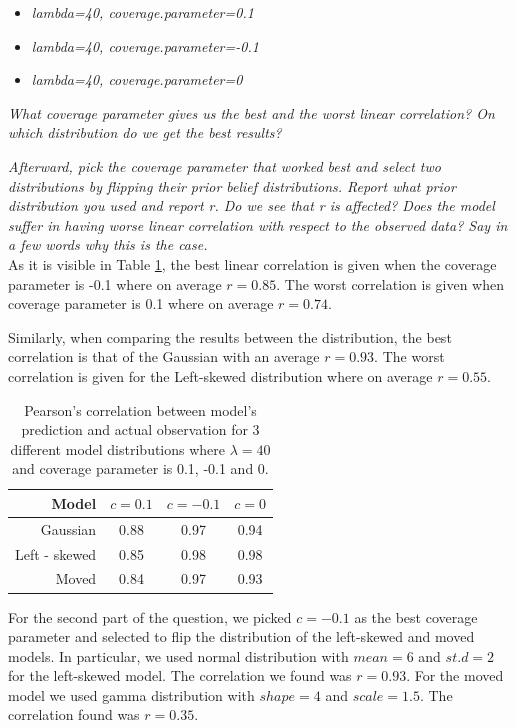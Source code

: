 \documentclass[11pt,a4paper,oneside]{article}
\begin{document}
\begin{itemize}
    \item \textit{lambda=40, coverage.parameter=0.1}
    \item \textit{lambda=40, coverage.parameter=-0.1}
    \item \textit{lambda=40, coverage.parameter=0}
\end{itemize}

\textit{What coverage parameter gives us the best and the worst linear correlation? On which distribution do we get the best results?}

\textit{Afterward, pick the coverage parameter that worked best and select two distributions by flipping their prior belief distributions. Report what prior distribution you used and report r. Do we see that r is affected? Does the model suffer in having worse linear correlation with respect to the observed data? Say in a few words why this is the case.}\\

As it is visible in Table \ref{question_3}, the best linear correlation is given when the coverage parameter is -0.1 where on average $r = 0.85$. The worst correlation is given when coverage parameter is 0.1 where on average $r = 0.74$.

Similarly, when comparing the results between the distribution, the best correlation is that of the Gaussian with an average $r = 0.93$. The worst correlation is given for the Left-skewed distribution where on average $r = 0.55$.

\begin{table}[ht]
\centering
\begin{tabular}{rccc}
  \hline
 Model & $c = 0.1$ & $c = -0.1$ & $c = 0$ \\ 
  \hline
    Gaussian & 0.88 & 0.97 & 0.94\\ 
    Left - skewed & 0.85 & 0.98 & 0.98\\ 
    Moved & 0.84 & 0.97 & 0.93\\ 
   \hline
\end{tabular}
\caption{Pearson's correlation between model's prediction and actual observation for 3 different model distributions where $\lambda = 40$ and coverage parameter is 0.1, -0.1 and 0.}
\label{question_3}
\end{table}

For the second part of the question, we picked $c = -0.1$ as the best coverage parameter and selected to flip the distribution of the left-skewed and moved models. In particular, we used normal distribution with $mean = 6$ and $st.d = 2$ for the left-skewed model. The correlation we found was $r = 0.93$. For the moved model we used gamma distribution with $shape = 4$ and $scale = 1.5$. The correlation found was $r = 0.35$.
\end{document}
